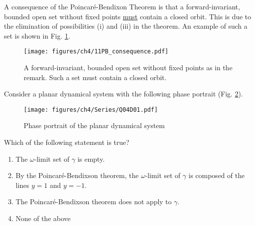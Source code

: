 \begin{remark}[]
	A consequence of the Poincaré-Bendixon Theorem is that a forward-invariant, bounded open set without fixed points \underline{must} contain a closed orbit. This is due to the elimination of possibilities (i) and (iii) in the theorem. An example of such a set is shown in Fig. \ref{fig:PB_consequence}.
	\begin{figure}[h!]
		\centering
		\texttt{[image: figures/ch4/11PB\_consequence.pdf]}
		\caption{A forward-invariant, bounded open set without fixed points as in the remark. Such a set must contain a closed orbit.}
		\label{fig:PB_consequence}
	\end{figure}
\end{remark}

\begin{exercise}
	Consider a planar dynamical system with the following phase portrait (Fig. \ref{fig:ex51}).
\begin{figure}[h]
	\centering
	\texttt{[image: figures/ch4/Series/Q04D01.pdf]}
	\label{fig:ex51}
	\caption{Phase portrait of the planar dynamical system}
\end{figure}

Which of the following statement is true?
\begin{enumerate}
	\item The $\omega$-limit set of $\gamma$ is empty.
	\item By the Poincaré-Bendixson theorem, the $\omega$-limit set of $\gamma$ is composed of the lines $y = 1$ and $y = -1$.
	\item The Poincaré-Bendixson theorem does not apply to $\gamma$.
	\item None of the above
\end{enumerate}

\end{exercise}


